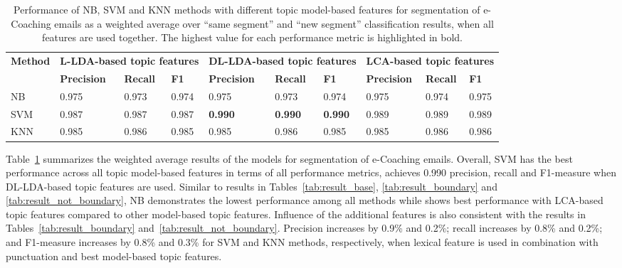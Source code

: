 \documentclass{amia}
\begin{document}
\begin{table}[ht]
\centering
\caption{Performance of NB, SVM and KNN methods with different topic model-based features for segmentation of e-Coaching emails as a weighted average over ``same segment'' and ``new segment'' classification results, when all features are used together. The highest value for each performance metric is highlighted in bold.}
\label{tab:result_weighted_avg}
  \begin{tabular}{|l|l|l|l|l|l|l|l|l|l|}
  \hline
   \multirow{2}{*}{\textbf{Method}} & \multicolumn{3}{|c|}{\textbf{L-LDA-based topic features}} & \multicolumn{3}{|c|}{\textbf{DL-LDA-based topic features}}  & \multicolumn{3}{|c|}{\textbf{LCA-based topic features}} \\\cline{2-10} & \textbf{Precision}  & \textbf{Recall} & \textbf{F1} & \textbf{Precision}  & \textbf{Recall} & \textbf{F1} & \textbf{Precision}  & \textbf{Recall} & \textbf{F1}\\ \hline  
    
 NB & 0.975 & 0.973 & 0.974 & 0.975 & 0.973 & 0.974 & 0.975 & 0.974 & 0.975 \\ \hline
 SVM & 0.987 & 0.987 & 0.987 & \textbf{0.990} & \textbf{0.990} & \textbf{0.990} & 0.989 & 0.989 & 0.989 \\ \hline
 KNN & 0.985 & 0.986 & 0.985 & 0.985 & 0.986 & 0.985 & 0.985 & 0.986 & 0.986 \\ \hline
  \end{tabular}
\end{table}         

Table~\ref{tab:result_weighted_avg} summarizes the weighted average results of the models for segmentation of e-Coaching emails. Overall, SVM has the best performance across all topic model-based features in terms of all performance metrics, achieves 0.990 precision, recall and F1-measure when DL-LDA-based topic features are used. Similar to results in Tables~\ref{tab:result_base}, \ref{tab:result_boundary} and \ref{tab:result_not_boundary}, NB demonstrates the lowest performance among all methods while shows best performance with LCA-based topic features compared to other model-based topic features. Influence of the additional features is also consistent with the results in Tables~\ref{tab:result_boundary} and~\ref{tab:result_not_boundary}. Precision increases by 0.9\% and 0.2\%; recall increases by 0.8\% and 0.2\%; and F1-measure increases by 0.8\% and 0.3\% for SVM and KNN methods, respectively, when lexical feature is used in combination with punctuation and best model-based topic features.\\
\end{document}
